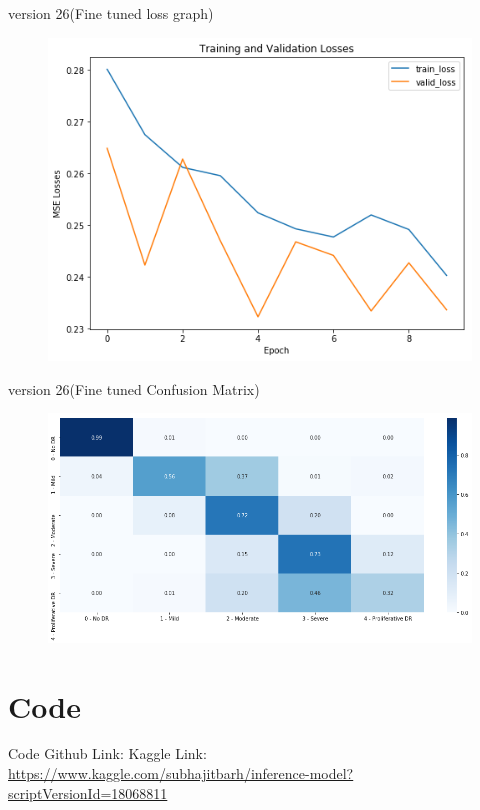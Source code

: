 \documentclass[10pt]{beamer}
\begin{document}
			\begin{frame}{version 26(Fine tuned loss graph)}
				\begin{figure}
					\includegraphics[scale=.5]{Results/vI26lossgraph.png}
				\end{figure}
			\end{frame}
			\begin{frame}{version 26(Fine tuned Confusion Matrix)}
				\begin{figure}
					\includegraphics[width=\linewidth]{Results/VI26confusionmatrix.png}
				\end{figure}
			\end{frame}
	\section{Code}
		\begin{frame}{Code}
			Github Link:\url {}
			Kaggle Link: \url{https://www.kaggle.com/subhajitbarh/inference-model?scriptVersionId=18068811}
		\end{frame}				
\end{document}
